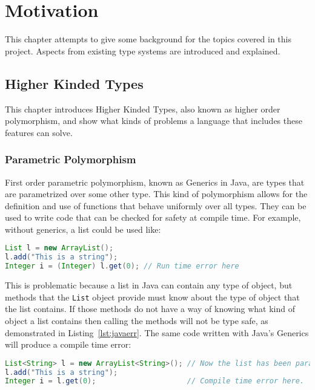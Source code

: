 \chapter{Motivation}\label{sec:motivation}
This chapter attempts to give some background for the topics covered in this
project. Aspects from existing type systems are introduced and explained.

\section{Higher Kinded Types}
This chapter introduces Higher Kinded Types, also known as higher order
polymorphism, and show what kinds of problems a language that includes these
features can solve.

\subsection{Parametric Polymorphism}\label{sec:generics}
First order parametric polymorphism, known as Generics in Java, are types that
are parametrized over some other type. This kind of polymorphism allows for the
definition and use of functions that behave uniformly over all types.  They can
be used to write code that can be checked for safety at compile time. For
example, without generics, a list could be used like:

\begin{lstlisting}[caption=Runtime error that could be avoided, language=Java, label={lst:javaerr}]
List l = new ArrayList();
l.add("This is a string");
Integer i = (Integer) l.get(0); // Run time error here
\end{lstlisting}

This is problematic because a list in Java can contain any type of object, but
methods that the \lstinline{List} object provide must know about the type of
object that the list contains. If those methods do not have a way of knowing
what kind of object a list contains then calling the methods will not be type
safe, as demonstrated in Listing~\ref{lst:javaerr}. The same code written with
Java's Generics will produce a compile time error:

\begin{lstlisting}[caption=Compile time error, language=Java, label={lst:generr}]
List<String> l = new ArrayList<String>(); // Now the list has been parametrized with a type
l.add("This is a string");
Integer i = l.get(0);                     // Compile time error here.
\end{lstlisting}

